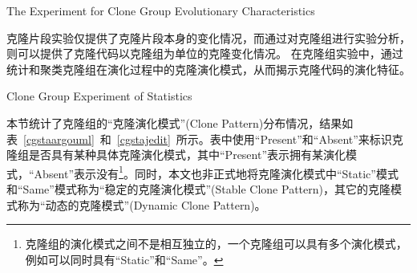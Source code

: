 
{The Experiment for Clone Group Evolutionary Characteristics}

克隆片段实验仅提供了克隆片段本身的变化情况，而通过对克隆组进行实验分析，则可以提供了克隆代码以克隆组为单位的克隆变化情况。 在克隆组实验中，通过统计和聚类克隆组在演化过程中的克隆演化模式，从而揭示克隆代码的演化特征。

{Clone Group Experiment of Statistics} 

本节统计了克隆组的“克隆演化模式”(Clone Pattern)分布情况，结果如表~\ref{cgstaargouml}~和~\ref{cgstajedit}~所示。表中使用“Present”和“Absent”来标识克隆组是否具有某种具体克隆演化模式，其中“Present”表示拥有某演化模式，“Absent”表示没有\footnote{克隆组的演化模式之间不是相互独立的，一个克隆组可以具有多个演化模式，例如可以同时具有“Static”和“Same”。}。同时，本文也非正式地将克隆演化模式中“Static”模式和“Same”模式称为“稳定的克隆演化模式”(Stable Clone Pattern)，其它的克隆模式称为“动态的克隆模式”(Dynamic Clone Pattern)。


